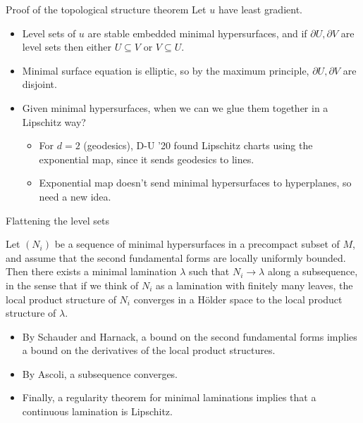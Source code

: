 \documentclass[10pt]{beamer}
\begin{document}
\begin{frame}{Proof of the topological structure theorem}
Let $u$ have least gradient.\pause
\begin{itemize}
\item Level sets of $u$ are stable embedded minimal hypersurfaces, and if $\partial U, \partial V$ are level sets then either $U \subseteq V$ or $V \subseteq U$.\pause
\item Minimal surface equation is elliptic, so by the maximum principle, $\partial U, \partial V$ are disjoint.\pause
\item Given minimal hypersurfaces, when we can we glue them together in a Lipschitz way?\pause
\begin{itemize}
\item For $d = 2$ (geodesics), D-U '20 found Lipschitz charts using the exponential map, since it sends geodesics to lines.\pause
\item Exponential map doesn't send minimal hypersurfaces to hyperplanes, so need a new idea.
\end{itemize}
\end{itemize}
\end{frame}

\begin{frame}{Flattening the level sets}

\begin{theorem}
Let $(N_i)$ be a sequence of minimal hypersurfaces in a precompact subset of $M$, and assume that the second fundamental forms are locally uniformly bounded.
Then there exists a minimal lamination $\lambda$ such that $N_i \to \lambda$ along a subsequence, in the sense that if we think of $N_i$ as a lamination with finitely many leaves, the local product structure of $N_i$ converges in a H\"older space to the local product structure of $\lambda$.
\end{theorem}\pause

\begin{itemize}
\item By Schauder and Harnack, a bound on the second fundamental forms implies a bound on the derivatives of the local product structures.\pause
\item By Ascoli, a subsequence converges.\pause
\item Finally, a regularity theorem for minimal laminations implies that a continuous lamination is Lipschitz.
\end{itemize}
\end{frame}
\end{document}
